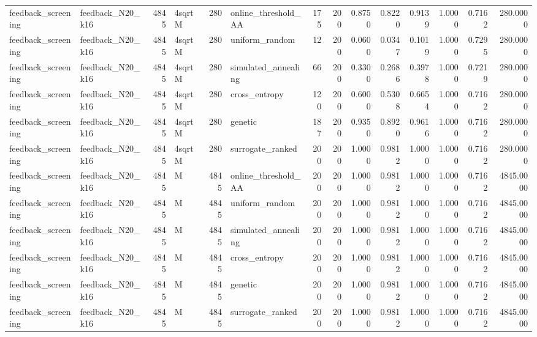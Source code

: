 \begin{tabular}{llrlrlrrrrrrrr}
feedback\_screening & feedback\_N20\_k16 & 4845 & 4sqrtM & 280 & online\_threshold\_AA & 175 & 200 & 0.8750 & 0.8220 & 0.9139 & 1.0000 & 0.7162 & 280.0000 \\
feedback\_screening & feedback\_N20\_k16 & 4845 & 4sqrtM & 280 & uniform\_random & 12 & 200 & 0.0600 & 0.0347 & 0.1019 & 1.0000 & 0.7295 & 280.0000 \\
feedback\_screening & feedback\_N20\_k16 & 4845 & 4sqrtM & 280 & simulated\_annealing & 66 & 200 & 0.3300 & 0.2686 & 0.3978 & 1.0000 & 0.7219 & 280.0000 \\
feedback\_screening & feedback\_N20\_k16 & 4845 & 4sqrtM & 280 & cross\_entropy & 120 & 200 & 0.6000 & 0.5308 & 0.6654 & 1.0000 & 0.7162 & 280.0000 \\
feedback\_screening & feedback\_N20\_k16 & 4845 & 4sqrtM & 280 & genetic & 187 & 200 & 0.9350 & 0.8920 & 0.9616 & 1.0000 & 0.7162 & 280.0000 \\
feedback\_screening & feedback\_N20\_k16 & 4845 & 4sqrtM & 280 & surrogate\_ranked & 200 & 200 & 1.0000 & 0.9812 & 1.0000 & 1.0000 & 0.7162 & 280.0000 \\
feedback\_screening & feedback\_N20\_k16 & 4845 & M & 4845 & online\_threshold\_AA & 200 & 200 & 1.0000 & 0.9812 & 1.0000 & 1.0000 & 0.7162 & 4845.0000 \\
feedback\_screening & feedback\_N20\_k16 & 4845 & M & 4845 & uniform\_random & 200 & 200 & 1.0000 & 0.9812 & 1.0000 & 1.0000 & 0.7162 & 4845.0000 \\
feedback\_screening & feedback\_N20\_k16 & 4845 & M & 4845 & simulated\_annealing & 200 & 200 & 1.0000 & 0.9812 & 1.0000 & 1.0000 & 0.7162 & 4845.0000 \\
feedback\_screening & feedback\_N20\_k16 & 4845 & M & 4845 & cross\_entropy & 200 & 200 & 1.0000 & 0.9812 & 1.0000 & 1.0000 & 0.7162 & 4845.0000 \\
feedback\_screening & feedback\_N20\_k16 & 4845 & M & 4845 & genetic & 200 & 200 & 1.0000 & 0.9812 & 1.0000 & 1.0000 & 0.7162 & 4845.0000 \\
feedback\_screening & feedback\_N20\_k16 & 4845 & M & 4845 & surrogate\_ranked & 200 & 200 & 1.0000 & 0.9812 & 1.0000 & 1.0000 & 0.7162 & 4845.0000 \\
\bottomrule
\end{tabular}
